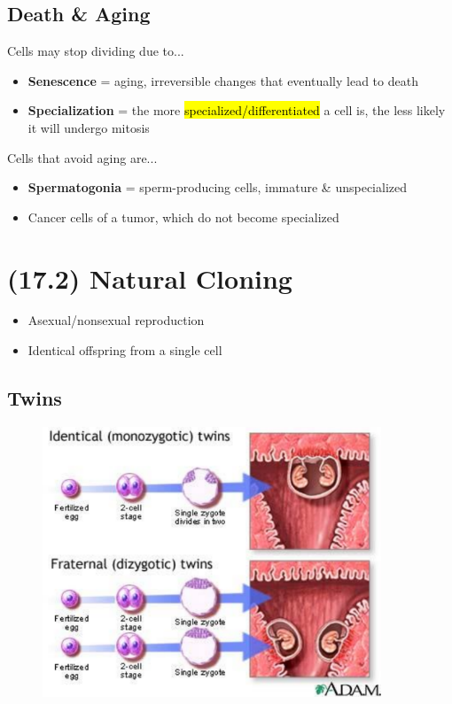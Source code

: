 \documentclass[a4paper,12pt]{article}
\begin{document}
\subsection{Death \& Aging}\noindent

Cells may stop dividing due to...
\begin{itemize}
    \item{\textbf{Senescence} = aging, irreversible changes that eventually lead to death}
    \item{\textbf{Specialization} = the more \hl{specialized/differentiated} a cell is, the less likely it will undergo mitosis}
\end{itemize}

Cells that avoid aging are...
\begin{itemize}
    \item{\textbf{Spermatogonia} = sperm-producing cells, immature \& unspecialized}
    \item{Cancer cells of a tumor, which do not become specialized}
\end{itemize}

\section{(17.2) Natural Cloning}
\begin{itemize}
    \item{Asexual/nonsexual reproduction}
    \item{Identical offspring from a single cell}
\end{itemize}

\subsection{Twins}
\begin{figure}[H]
    \centering
    \includegraphics[width=0.9\textwidth]{twins}
\end{figure}
\end{document}
